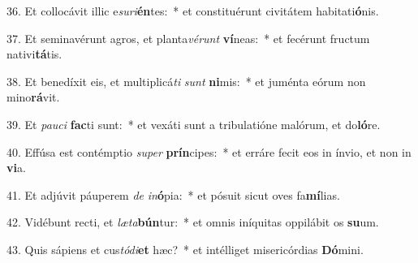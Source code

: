 36. Et collocávit illic e\textit{su}\textit{ri}\textbf{én}tes:~*  et constituérunt civitátem habitati\textbf{ó}nis.\

37. Et seminavérunt agros, et planta\textit{vé}\textit{runt} \textbf{ví}neas:~*  et fecérunt fructum nativi\textbf{tá}tis.\

38. Et benedíxit eis, et multiplicá\textit{ti} \textit{sunt} \textbf{ni}mis:~*  et juménta eórum non mino\textbf{rá}vit.\

39. Et \textit{pau}\textit{ci} \textbf{fac}ti sunt:~*  et vexáti sunt a tribulatióne malórum, et do\textbf{ló}re.\

40. Effúsa est contémptio \textit{su}\textit{per} \textbf{prín}cipes:~*  et erráre fecit eos in ínvio, et non in \textbf{vi}a.\

41. Et adjúvit páuperem \textit{de} \textit{in}\textbf{ó}pia:~*  et pósuit sicut oves fa\textbf{mí}lias.\

42. Vidébunt recti, et \textit{læ}\textit{ta}\textbf{bún}tur:~*  et omnis iníquitas oppilábit os \textbf{su}um.\

43. Quis sápiens et cus\textit{tó}\textit{di}\textbf{et} hæc?~*  et intélliget misericórdias \textbf{Dó}mini.\

